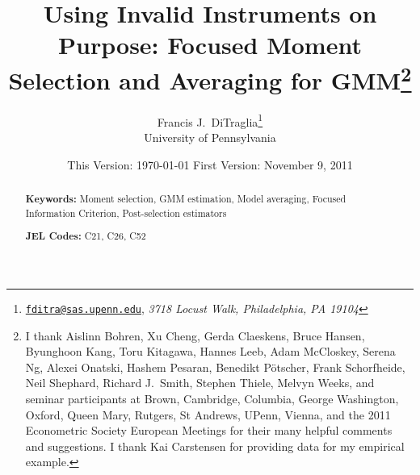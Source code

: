 \documentclass[12pt]{article}
\begin{document}
\title{Using Invalid Instruments on Purpose: Focused Moment Selection and Averaging for GMM\footnote{I thank Aislinn Bohren, Xu Cheng, Gerda Claeskens, Bruce Hansen, Byunghoon Kang, Toru Kitagawa, Hannes Leeb, Adam McCloskey, Serena Ng, Alexei Onatski, Hashem Pesaran, Benedikt P\"{o}tscher, Frank Schorfheide, Neil Shephard, Richard J.\ Smith, Stephen Thiele, Melvyn Weeks, and seminar participants at 
Brown, Cambridge, Columbia, George Washington, Oxford, Queen Mary, Rutgers, St Andrews, UPenn, Vienna, and the 2011 Econometric Society European Meetings for their many helpful comments and suggestions. I thank Kai Carstensen for providing data for my empirical example.}}

\author{Francis J.\ DiTraglia\footnote{
\href{mailto:fditra@sas.upenn.edu}{\texttt{fditra@sas.upenn.edu}}, \emph{3718 Locust Walk, Philadelphia, PA 19104}}
 \\ University of Pennsylvania}

\date{\footnotesize This Version: \today \hspace{0.5em} First Version: November 9, 2011}

\maketitle 
\begin{abstract}
	

	\bigskip
	\noindent\textbf{Keywords:} Moment selection, GMM estimation, Model averaging, Focused Information Criterion, Post-selection estimators

	\medskip
	\noindent\textbf{JEL Codes:} C21, C26, C52 
\end{abstract}
















\newpage
\appendix







%



\end{document}
